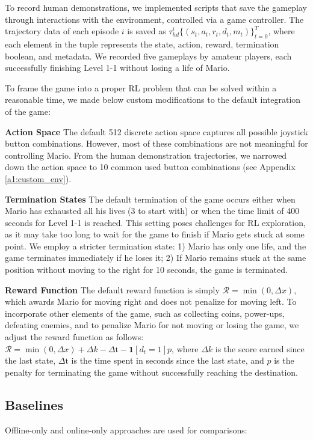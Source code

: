 \documentclass{article}
\begin{document}
To record human demonstrations, we implemented scripts that save the gameplay 
through interactions with the environment, controlled via a game controller. 
The trajectory data of each episode $i$ is saved as $\tau_{hd}^{i} \{(s_t, a_t, 
r_t, d_t, m_t)\}_{t=0}^{T}$, where each element in the tuple represents the 
state, action, reward, termination boolean, and metadata. We recorded five 
gameplays by amateur players, each successfully finishing Level 1-1 without 
losing a life of Mario.

To frame the game into a proper RL problem that can be solved within a
reasonable time, we made below custom modifications to the default integration
of the game:

\textbf{Action Space} 
The default 512 discrete action space captures all possible joystick button 
combinations. However, most of these combinations are not meaningful for 
controlling Mario. From the human demonstration trajectories, we narrowed down 
the action space to 10 common used button combinations (see 
Appendix \ref{a1:custom_env}).

\textbf{Termination States}
The default termination of the game occurs either when Mario has exhausted all 
his lives (3 to start with) or when the time limit of 400 seconds for Level 1-1 is reached. This 
setting poses challenges for RL exploration, as it may take too long to wait 
for the game to finish if Mario gets stuck at some point. We employ a stricter 
termination state: 1) Mario has only one life, and the game terminates 
immediately if he loses it; 2) If Mario remains stuck at the same position 
without moving to the right for 10 seconds, the game is terminated.

\textbf{Reward Function}
The default reward function is simply $\mathcal{R} = \min(0,\Delta x)$, which 
awards Mario for moving right and does not penalize for moving left. To 
incorporate other elements of the game, such as collecting coins, power-ups, 
defeating enemies, and to penalize Mario for not moving or losing the game, we 
adjust the reward function as follows: 
$\mathcal{R} = \min(0,\Delta x) + \Delta k - \Delta \text{t} - \mathbf{1}[d_t = 1] p$, 
where $\Delta k$ is the score earned since the last state, $\Delta \text{t}$ is 
the time spent in seconds since the last state, and $p$ is the penalty for 
terminating the game without successfully reaching the destination.


\subsection{Baselines}
Offline-only and online-only approaches are used for 
          comparisons:
\end{document}
